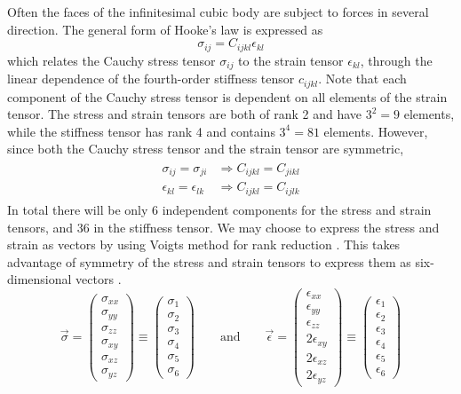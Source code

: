 \documentclass[twoside,english]{uiofysmaster}
\begin{document}
Often the faces of the infinitesimal cubic body are subject to forces in several direction. 
The general form of Hooke's law is expressed as
\begin{equation}
\sigma_{ij} = C_{ijkl}\epsilon_{kl}
\end{equation}
which relates the Cauchy stress tensor $\sigma_{ij}$ to the strain tensor $\epsilon_{kl}$, through the linear dependence of the fourth-order stiffness tensor $c_{ijkl}$.
Note that each component of the Cauchy stress tensor is dependent on all elements of the strain tensor. 
The stress and strain tensors are both of rank 2 and have $3^2=9$ elements, while the stiffness tensor has rank 4 and contains $3^4=81$ elements.
However, since both the Cauchy stress tensor and the strain tensor are symmetric, 
\begin{align}
\begin{split}
\sigma_{ij} = \sigma_{ji} &\Rightarrow C_{ijkl} = C_{jikl}\\
\epsilon_{kl} = \epsilon_{lk} &\Rightarrow C_{ijkl} = C_{ijlk}
\end{split}
\end{align}
In total there will be only 6 independent components for the stress and strain tensors, and 36 in the stiffness tensor. 
We may choose to express the stress and strain as vectors by using Voigts method for rank reduction \cite{Voigt}. 
This takes advantage of symmetry of the stress and strain tensors to express them as six-dimensional vectors \cite{introductionToElasticity}. 
\begin{equation}
\vec{\sigma} = 
\begin{pmatrix}
\sigma_{xx} \\
\sigma_{yy} \\
\sigma_{zz} \\
\sigma_{xy} \\ 
\sigma_{xz} \\
\sigma_{yz}
\end{pmatrix}
\equiv
\begin{pmatrix}
\sigma_{1} \\
\sigma_{2} \\
\sigma_{3} \\
\sigma_{4} \\ 
\sigma_{5} \\
\sigma_{6}
\end{pmatrix}
\qquad
\text{and}
\qquad
\vec{\epsilon} = 
\begin{pmatrix}
\epsilon_{xx} \\
\epsilon_{yy} \\
\epsilon_{zz} \\
2\epsilon_{xy} \\ 
2\epsilon_{xz} \\
2\epsilon_{yz}
\end{pmatrix}
\equiv
\begin{pmatrix}
\epsilon_{1} \\
\epsilon_{2} \\
\epsilon_{3} \\
\epsilon_{4} \\ 
\epsilon_{5} \\
\epsilon_{6}
\end{pmatrix}
\end{equation}
\end{document}
